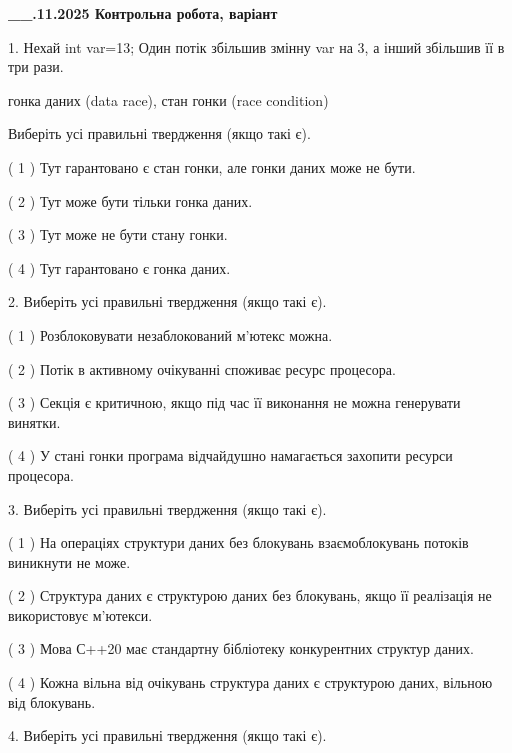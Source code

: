\documentclass[12pt, ukrainian]{article}
\begin{document}
\newpage
\begin {large}

\textbf{\_\_.11.2025 Контрольна робота, варіант  }\par


{
1. Нехай int var=13; Один потік збільшив змінну var на 3, а інший збільшив її в три рази.

гонка даних (data race), стан гонки (race condition)

Виберіть усі правильні твердження (якщо такі є).\par
\vspace{2mm}
( 1 ) Тут гарантовано є стан гонки, але гонки даних може не бути.%

( 2 ) Тут може бути тільки гонка даних.%

( 3 ) Тут може не бути стану гонки.%

( 4 ) Тут гарантовано є гонка даних.%


2. Виберіть усі правильні твердження (якщо такі є).\par
\vspace{2mm}

( 1 ) Розблоковувати незаблокований м’ютекс можна.%

( 2 ) Потік в активному очікуванні споживає ресурс процесора.%

( 3 ) Секція є критичною, якщо під час її виконання не можна генерувати винятки.%

( 4 ) У стані гонки програма відчайдушно намагається захопити ресурси процесора.%


3. Виберіть усі правильні твердження (якщо такі є).\par
\vspace{2mm}

( 1 ) На операціях структури даних без блокувань взаємоблокувань потоків виникнути не може.%

( 2 ) Структура даних є структурою даних без блокувань, якщо її реалізація не використовує м’ютекси.%

( 3 ) Мова С++20 має стандартну бібліотеку конкурентних структур даних.%

( 4 ) Кожна вільна від очікувань структура даних є структурою даних, вільною від блокувань.%


4. Виберіть усі правильні твердження (якщо такі є).\par
\vspace{2mm}

}
\end{large}
\end{document}
